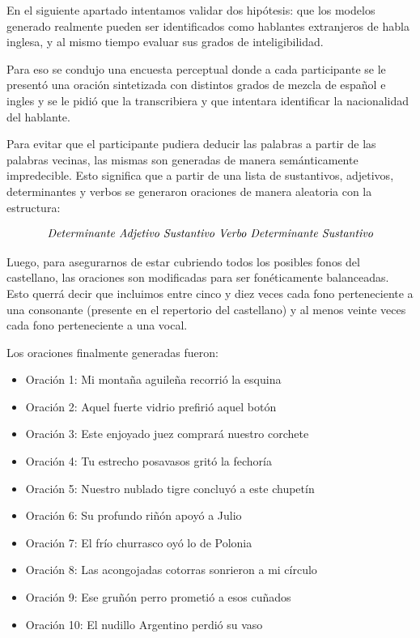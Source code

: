 
En el siguiente apartado intentamos validar dos hipótesis: que los modelos generado realmente pueden ser identificados como hablantes extranjeros de habla inglesa, y al mismo tiempo evaluar sus grados de inteligibilidad.

Para eso se condujo una encuesta perceptual donde a cada participante se le presentó una oración sintetizada con distintos grados de mezcla de español e ingles y se le pidió que la transcribiera y que intentara identificar la nacionalidad del hablante. 

Para evitar que el participante pudiera deducir las palabras a partir de las palabras vecinas, las mismas son generadas de manera semánticamente impredecible. Esto significa que a partir de una lista de sustantivos, adjetivos, determinantes y verbos se generaron oraciones de manera aleatoria con la estructura:

$$\textnormal{\textit{Determinante Adjetivo Sustantivo Verbo Determinante Sustantivo}}$$

Luego, para asegurarnos de estar cubriendo todos los posibles fonos del castellano, las oraciones son modificadas para ser fonéticamente balanceadas. Esto querrá decir que incluimos entre cinco y diez veces cada fono perteneciente a una consonante (presente en el repertorio del castellano) y al menos veinte veces cada fono perteneciente a una vocal.

Los oraciones finalmente generadas fueron:

\begin{itemize}
\item Oración 1: Mi montaña aguileña recorrió la esquina
\item Oración 2: Aquel fuerte vidrio prefirió aquel botón
\item Oración 3: Este enjoyado juez comprará nuestro corchete
\item Oración 4: Tu estrecho posavasos gritó la fechoría
\item Oración 5: Nuestro nublado tigre concluyó a este chupetín
\item Oración 6: Su profundo riñón apoyó a Julio
\item Oración 7: El frío churrasco oyó lo de Polonia
\item Oración 8: Las acongojadas cotorras sonrieron a mi círculo
\item Oración 9: Ese gruñón perro prometió a esos cuñados
\item Oración 10: El nudillo Argentino perdió su vaso
\end{itemize}

